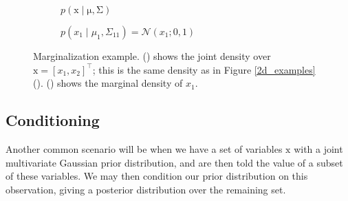 \documentclass{article}
\newcommand{\given}{\mid}
\newcommand{\mc}[1]{\mathcal{#1}}
\newcommand{\trans}{^\top}
\newcommand{\mat}[1]{\bm{\mathrm{#1}}}
\renewcommand{\vec}[1]{\bm{\mathrm{#1}}}
\begin{document}
\begin{figure}
  \centering
  \begin{subfigure}[t]{0.49\textwidth}
    
    \caption{$p(\vec{x} \given \vec{\mu}, \mat{\Sigma})$}
    \label{marginal_2d_pdf}
  \end{subfigure}
  \begin{subfigure}[t]{0.49\textwidth}
    
    \caption{$p(x_1 \given \mu_1, \Sigma_{11}) = \mc{N}(x_1; 0, 1)$}
    \label{marginal_pdf}
  \end{subfigure}
  \caption{Marginalization example.  () shows
    the joint density over $\vec{x} = [x_1, x_2]\trans$; this is the same
    density as in Figure \ref{2d_examples}().
    () shows the marginal density of $x_1$.}
  \label{marginal_example}
\end{figure}

\subsection*{Conditioning}

Another common scenario will be when we have a set of variables
$\vec{x}$ with a joint multivariate Gaussian prior distribution, and
are then told the value of a subset of these variables.  We may then
condition our prior distribution on this observation, giving a
posterior distribution over the remaining set.
\end{document}
